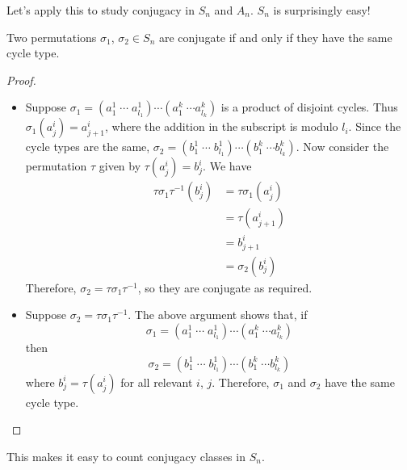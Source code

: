 \documentclass{../../template/note}
\begin{document}
    Let's apply this to study conjugacy in \(S_n\) and \(A_n\). \(S_n\) is surprisingly easy!

    \begin{theorem}[Conjugacy in \(S_n\)]
        Two permutations \(\sigma_1\), \(\sigma_2 \in S_n\) are conjugate if and only if they have the same cycle type.
        \label{conjugacy-sn}
    \end{theorem}
    
    \begin{proof}
        \begin{itemize}
            \item[\(\implies\)] Suppose \(\sigma_1 = (a_1^1 \; \cdots \; a_{l_1}^1)\cdots (a_1^k \; \cdots a_{l_k}^k)\) is a product of disjoint cycles. Thus \(\sigma_1(a_j^i) = a_{j+1}^i\), where the addition in the subscript is modulo \(l_i\). Since the cycle types are the same, \(\sigma_2 = (b_1^1 \; \cdots \; b_{l_1}^1)\cdots (b_1^k \; \cdots b_{l_k}^k)\). Now consider the permutation \(\tau\) given by \(\tau(a_j^i) = b_j^i\). We have
            \begin{align*}
                \tau \sigma_1 \tau^{-1}(b_j^i) &= \tau\sigma_1(a_j^i) \\
                &= \tau(a^i_{j+1}) \\
                &= b^i_{j+1} \\
                &= \sigma_2(b^i_j)
            \end{align*}
            Therefore, \(\sigma_2 = \tau\sigma_1\tau^{-1}\), so they are conjugate as required.
        \end{itemize}
        \begin{itemize}
            \item[\(\impliedby\)] Suppose \(\sigma_2 = \tau\sigma_1\tau^{-1}\). The above argument shows that, if
            \[
                \sigma_1 = (a_1^1 \; \cdots \; a_{l_1}^1)\cdots (a_1^k \; \cdots a_{l_k}^k)
            \]
            then
            \[
                \sigma_2 = (b_1^1 \; \cdots \; b_{l_1}^1)\cdots (b_1^k \; \cdots b_{l_k}^k)
            \]
            where \(b_j^i = \tau(a_j^i)\) for all relevant \(i\), \(j\). Therefore, \(\sigma_1\) and \(\sigma_2\) have the same cycle type.
        \end{itemize}
    \end{proof}
    
    This makes it easy to count conjugacy classes in \(S_n\).
\end{document}
